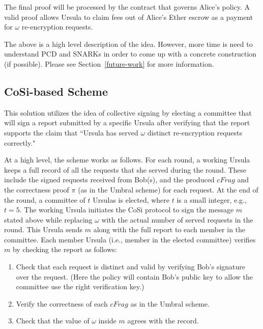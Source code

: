 The final proof will be processed by the contract that governs Alice's policy. A valid proof 
allows Ursula to claim fees out of Alice's Ether escrow as a payment for $\omega$ re-encryption  
requests. 


The above is a high level description of the idea. However, more time is need to 
understand PCD and SNARKs in order to come up with a concrete construction 
(if possible). Please see Section~\ref{future-work} for more information.


\subsection{CoSi-based Scheme}
This solution utilizes the idea of collective signing by electing a committee 
that will sign a report submitted by a specific Ursula after verifying that 
the report supports the claim that ``Ursula has served $\omega$ distinct 
re-encryption requests correctly." 


At a high level, the scheme works as follows. For each round, a working Ursula keeps 
a full record of all the requests that she served during the round. These 
include the signed requests received from Bob(s), and the produced $cFrag$ 
and the correctness proof $\pi$ (as in the Umbral scheme) for 
each request. At the end of the round, a committee of $t$ Ursulas is 
elected, where $t$ is a small integer, e.g., $t = 5$. The working Ursula 
initiates the CoSi protocol to sign the message $m$ stated above while 
replacing $\omega$ with the actual number of served 
requests in the round. This Ursula sends $m$ along with the full report to 
each member in the committee. Each member Ursula (i.e., member in the 
elected committee) verifies $m$ by checking the report as follows:
\begin{enumerate}
\setlength{\itemsep}{0pt}
\item Check that each request is distinct and valid by verifying Bob's 
signature over the request. (Here the policy will contain Bob's public 
key to allow the committee use the right verification key.)


\item Verify the correctness of each $cFrag$ as in the Umbral 
scheme.

\item Check that the value of $\omega$ inside $m$ agrees with the 
record.
\end{enumerate}


